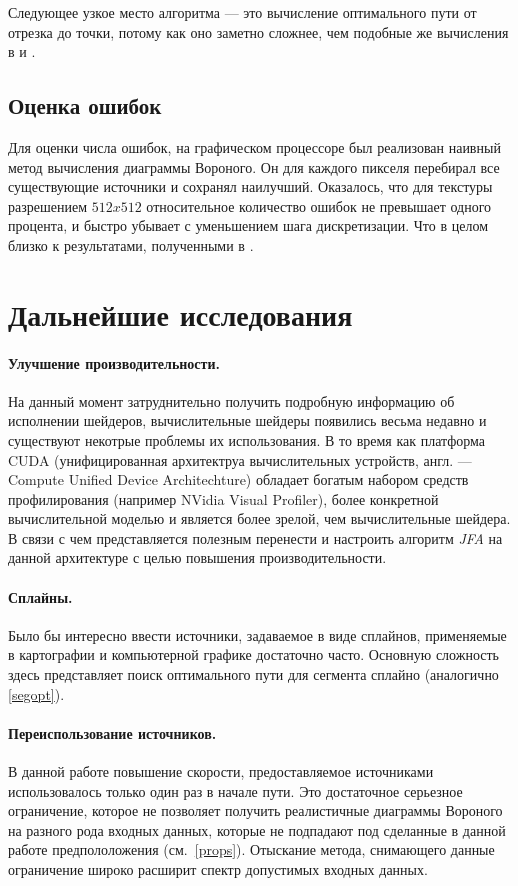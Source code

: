 \documentclass[12pt]{article}
\begin{document}
Следующее узкое место алгоритма --- это вычисление оптимального пути от отрезка
до точки, потому как оно заметно сложнее, чем подобные же вычисления в \cite{jfa} и 
\cite{gvd}.

\subsection{Оценка ошибок}
Для оценки числа ошибок, на графическом процессоре был реализован наивный метод
вычисления диаграммы Вороного. Он для каждого пикселя перебирал все 
существующие источники и сохранял наилучший. Оказалось, что для текстуры 
разрешением $512x512$ относительное количество ошибок не превышает одного процента,
и быстро убывает с уменьшением шага дискретизации. Что в целом близко к
результатами, полученными в \cite{gvd}.

\section{Дальнейшие исследования}
\label{future}
\paragraph{Улучшение производительности.} На данный момент затруднительно получить
подробную информацию об исполнении шейдеров, вычислительные шейдеры появились
весьма недавно и существуют некотрые проблемы их использования. В то 
время как платформа CUDA (унифицированная архитектруа вычислительных устройств, англ. 
--- Compute Unified Device Architechture) обладает богатым набором средств 
профилирования (например NVidia Visual Profiler), более конкретной вычислительной моделью и является более зрелой, чем
вычислительные шейдера. В связи с чем представляется полезным перенести и настроить
алгоритм  \emph{JFA} на данной архитектуре с целью повышения производительности.


\paragraph{Сплайны.} Было бы интересно ввести источники, задаваемое в виде сплайнов,
применяемые в картографии и компьютерной графике достаточно часто. Основную сложность
здесь представляет поиск оптимального пути для сегмента сплайно (аналогично \ref{segopt}).

\paragraph{Переиспользование источников.} В данной работе повышение скорости, 
предоставляемое источниками использовалось только один раз в начале пути.
Это достаточное серьезное ограничение, которое не позволяет получить реалистичные
диаграммы Вороного на разного рода входных данных, которые не подпадают под 
сделанные в данной работе предпололожения (см.~\ref{props}). Отыскание метода,
снимающего данные ограничение широко расширит спектр допустимых входных данных.
\end{document}
